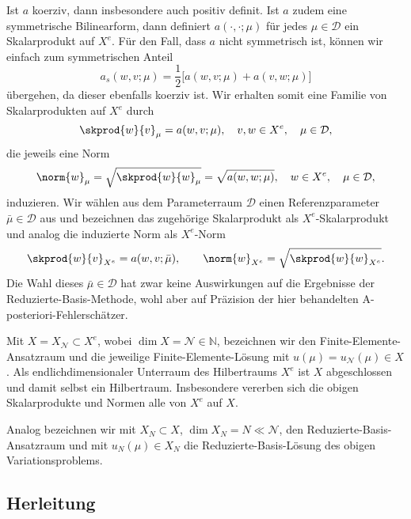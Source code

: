 Ist $a$ koerziv, dann insbesondere auch positiv definit.
Ist $a$ zudem eine symmetrische Bilinearform, dann definiert $a(\cdot, \cdot; \mu)$ für jedes $\mu \in \mathcal D$ ein Skalarprodukt auf $X^e$.
Für den Fall, dass $a$ nicht symmetrisch ist, können wir einfach zum symmetrischen Anteil
\begin{equation}
    a_s(w, v; \mu) = \frac{1}{2} \Big[ a(w, v; \mu) + a(v, w; \mu) \Big]
\end{equation}
übergehen, da dieser ebenfalls koerziv ist.
Wir erhalten somit eine Familie von Skalarprodukten auf $X^e$ durch
\begin{equation}
    \skprod{w}{v}_{\mu} = a(w, v; \mu), \quad v, w \in X^e, \quad \mu \in \mathcal D,
\end{equation}
die jeweils eine Norm
\begin{equation}
    \norm{w}_{\mu} = \sqrt{\skprod{w}{w}_{\mu}} = \sqrt{a(w, w; \mu)}, \quad w \in X^e, \quad \mu \in \mathcal D,
\end{equation}
induzieren.
Wir wählen aus dem Parameterraum $\mathcal D$ einen Referenzparameter $\bar \mu \in \mathcal D$ aus und bezeichnen das zugehörige Skalarprodukt als $X^e$-Skalarprodukt und analog die induzierte Norm als $X^e$-Norm
\begin{equation}
    \skprod{w}{v}_{X^e} = a(w, v; \bar \mu),
    \qquad
    \norm{w}_{X^e} = \sqrt{\skprod{w}{w}_{X^e}}.
\end{equation}
Die Wahl dieses $\bar \mu \in \mathcal D$ hat zwar keine Auswirkungen auf die Ergebnisse der Reduzierte-Basis-Methode, wohl aber auf Präzision der hier behandelten A-posteriori-Fehlerschätzer.

Mit $X = X_{\mathcal N} \subset X^e$, wobei $\dim X = \mathcal N \in \mathbb{N}$, bezeichnen wir den Finite-Elemente-Ansatzraum und die jeweilige Finite-Elemente-Lösung mit $u(\mu) = u_{\mathcal N}(\mu) \in X$.
Als endlichdimensionaler Unterraum des Hilbertraums $X^e$ ist $X$ abgeschlossen und damit selbst ein Hilbertraum.
Insbesondere vererben sich die obigen Skalarprodukte und Normen alle von $X^e$ auf $X$.

Analog bezeichnen wir mit $X_N \subset X$, $\dim X_N = N \ll \mathcal N$, den Reduzierte-Basis-Ansatzraum und mit $u_N(\mu) \in X_N$ die Reduzierte-Basis-Lösung des obigen Variationsproblems.

\subsection{Herleitung} %
\label{sub:herleitung}

